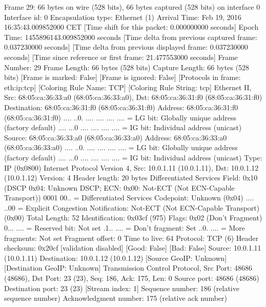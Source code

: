 Frame 29: 66 bytes on wire (528 bits), 66 bytes captured (528 bits) on interface 0
    Interface id: 0
    Encapsulation type: Ethernet (1)
    Arrival Time: Feb 19, 2016 16:35:43.009852000 CET
    [Time shift for this packet: 0.000000000 seconds]
    Epoch Time: 1455896143.009852000 seconds
    [Time delta from previous captured frame: 0.037230000 seconds]
    [Time delta from previous displayed frame: 0.037230000 seconds]
    [Time since reference or first frame: 21.477553000 seconds]
    Frame Number: 29
    Frame Length: 66 bytes (528 bits)
    Capture Length: 66 bytes (528 bits)
    [Frame is marked: False]
    [Frame is ignored: False]
    [Protocols in frame: eth:ip:tcp]
    [Coloring Rule Name: TCP]
    [Coloring Rule String: tcp]
Ethernet II, Src: 68:05:ca:36:33:a0 (68:05:ca:36:33:a0), Dst: 68:05:ca:36:31:f0 (68:05:ca:36:31:f0)
    Destination: 68:05:ca:36:31:f0 (68:05:ca:36:31:f0)
        Address: 68:05:ca:36:31:f0 (68:05:ca:36:31:f0)
        .... ..0. .... .... .... .... = LG bit: Globally unique address (factory default)
        .... ...0 .... .... .... .... = IG bit: Individual address (unicast)
    Source: 68:05:ca:36:33:a0 (68:05:ca:36:33:a0)
        Address: 68:05:ca:36:33:a0 (68:05:ca:36:33:a0)
        .... ..0. .... .... .... .... = LG bit: Globally unique address (factory default)
        .... ...0 .... .... .... .... = IG bit: Individual address (unicast)
    Type: IP (0x0800)
Internet Protocol Version 4, Src: 10.0.1.11 (10.0.1.11), Dst: 10.0.1.12 (10.0.1.12)
    Version: 4
    Header length: 20 bytes
    Differentiated Services Field: 0x10 (DSCP 0x04: Unknown DSCP; ECN: 0x00: Not-ECT (Not ECN-Capable Transport))
        0001 00.. = Differentiated Services Codepoint: Unknown (0x04)
        .... ..00 = Explicit Congestion Notification: Not-ECT (Not ECN-Capable Transport) (0x00)
    Total Length: 52
    Identification: 0x03cf (975)
    Flags: 0x02 (Don't Fragment)
        0... .... = Reserved bit: Not set
        .1.. .... = Don't fragment: Set
        ..0. .... = More fragments: Not set
    Fragment offset: 0
    Time to live: 64
    Protocol: TCP (6)
    Header checksum: 0x20cf [validation disabled]
        [Good: False]
        [Bad: False]
    Source: 10.0.1.11 (10.0.1.11)
    Destination: 10.0.1.12 (10.0.1.12)
    [Source GeoIP: Unknown]
    [Destination GeoIP: Unknown]
Transmission Control Protocol, Src Port: 48686 (48686), Dst Port: 23 (23), Seq: 186, Ack: 175, Len: 0
    Source port: 48686 (48686)
    Destination port: 23 (23)
    [Stream index: 1]
    Sequence number: 186    (relative sequence number)
    Acknowledgment number: 175    (relative ack number)
